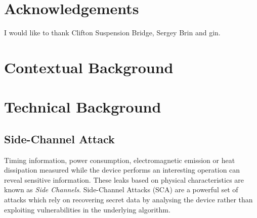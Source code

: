 \documentclass[10pt,a4paper,twoside]{book}
\begin{document}

\chapter*{Acknowledgements}

\noindent
I would like to thank Clifton Suspension Bridge, Sergey Brin and gin.


\cleardoublepage
\pagestyle{marked}
\parindent=0in
\parskip=8pt 



\chapter{Contextual Background}
\label{chap:context}



\chapter{Technical Background}
\label{chap:technical}


\section{Side-Channel Attack}

Timing information, power consumption, electromagnetic emission or heat dissipation measured while the device performs an interesting operation can reveal sensitive information. These leaks based on physical characteristics are known as \textit{Side Channels}. Side-Channel Attacks (SCA) are a powerful set of attacks which rely on recovering secret data by analysing the device rather than exploiting vulnerabilities in the underlying algorithm. 
\end{document}
